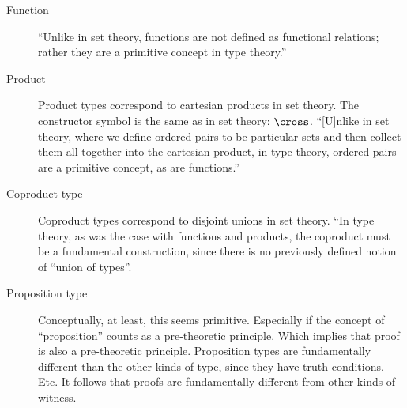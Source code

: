 \begin{description}
\item [Function] ``Unlike in set theory, functions are not defined as
  functional relations; rather they are a primitive concept in type
  theory.'' \citep[p. 21]{hottbook}

\item [Product] Product types correspond to cartesian products in set
  theory.  The constructor symbol is the same as in set theory:
  \(\cross\).
  ``[U]nlike in set theory, where we define ordered pairs to be
  particular sets and then collect them all together into the
  cartesian product, in type theory, ordered pairs are a primitive
  concept, as are functions.''\citep[p. 26]{hottbook}

\item [Coproduct type] Coproduct types correspond to disjoint unions
  in set theory.  ``In type theory, as was the case with functions and
  products, the coproduct must be a fundamental construction, since
  there is no previously defined notion of ``union of
  types''.\citep[p. 33]{hottbook}

\item [Proposition type] Conceptually, at least, this seems primitive.
  Especially if the concept of ``proposition'' counts as a
  pre-theoretic principle.  Which implies that proof is also a
  pre-theoretic principle.  Proposition types are fundamentally
  different than the other kinds of type, since they have
  truth-conditions. Etc.  It
  follows that proofs are fundamentally different from other kinds of
  witness.

\end{description}

